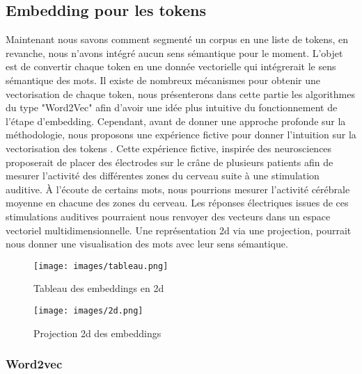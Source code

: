 \documentclass[12pt]{article}
\theoremstyle{definition}
\begin{document}
	
	\subsection{Embedding pour les tokens}

	Maintenant nous savons comment segmenté un corpus en une liste de tokens, en revanche, nous n'avons intégré aucun sens sémantique pour le moment. L'objet est de convertir chaque token en une donnée vectorielle qui intégrerait le sens sémantique des mots. Il existe de nombreux mécanismes pour obtenir une vectorisation de chaque token, nous présenterons dans cette partie les algorithmes du type "Word2Vec" afin d'avoir une idée plus intuitive du fonctionnement de l'étape d'embedding. Cependant, avant de donner une approche profonde sur la méthodologie, nous proposons une expérience fictive pour donner l'intuition sur la vectorisation des tokens \cite{video_embedding}. Cette expérience fictive, inspirée des neurosciences proposerait de placer des électrodes sur le crâne de plusieurs patients afin de mesurer l’activité des différentes zones du cerveau suite à une stimulation auditive. À l’écoute de certains mots, nous pourrions mesurer l’activité cérébrale moyenne en chacune des zones du cerveau. Les réponses électriques issues de ces stimulations auditives pourraient nous renvoyer des vecteurs dans un espace vectoriel multidimensionnelle. Une représentation 2d via une projection, pourrait nous donner une visualisation des mots avec leur sens sémantique. \\[1cm] 
	

\begin{figure}[!h]  %
	\centering
	\begin{minipage}[t]{0.45\textwidth}
		\centering
		\texttt{[image: images/tableau.png]}
		\caption{Tableau des embeddings en 2d}
	\end{minipage}\hfill
	\begin{minipage}[t]{0.45\textwidth}
		\centering
		\texttt{[image: images/2d.png]}
		\caption{Projection 2d des embeddings}
	\end{minipage}
\end{figure}







	\subsubsection{Word2vec}
	
\end{document}
